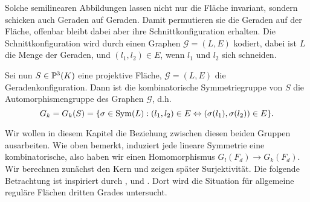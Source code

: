 Solche semilinearen Abbildungen lassen nicht nur die Fläche invariant, sondern schicken auch Geraden auf Geraden. Damit permutieren sie die Geraden auf der Fläche, offenbar bleibt dabei aber ihre Schnittkonfiguration erhalten. Die Schnittkonfiguration wird durch einen Graphen $\mathcal G = (L,E)$ kodiert, dabei ist $L$ die Menge der Geraden, und $(l_1, l_2) \in E$, wenn $l_1$ und $l_2$ sich schneiden.
\begin{defin}
Sei nun $S \in \mathbb P^{3}(K)$ eine projektive Fläche, $\mathcal G = (L,E)$ die Geradenkonfiguration. Dann ist die kombinatorische Symmetriegruppe von $S$ die Automorphismengruppe des Graphen $\mathcal G$, d.h.
\begin{equation}
G_k = G_k(S) = \{ \sigma \in \operatorname{Sym}(L): (l_1, l_2) \in E \Leftrightarrow (\sigma(l_1), \sigma(l_2)) \in E \}.
\end{equation}
\end{defin}

Wir wollen in diesem Kapitel die Beziehung zwischen diesen beiden Gruppen ausarbeiten. Wie oben bemerkt, induziert jede lineare Symmetrie eine kombinatorische, also haben wir einen Homomorphismus $G_l(F_d) \to G_k(F_d)$. Wir berechnen zunächst den Kern und zeigen später Surjektivität. Die folgende Betrachtung ist inspiriert durch \cite[Bem.~4.10.1, S.~404]{Hartshorne}, und \cite[Aufg. C--D, S.~180]{Mumford}. Dort wird die Situation für allgemeine reguläre Flächen dritten Grades untersucht.

